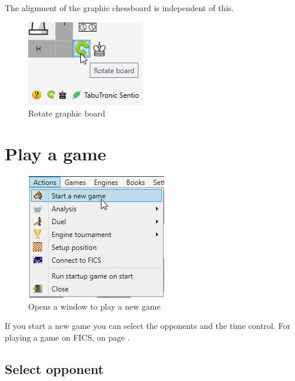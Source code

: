 \documentclass[11pt,a4paper]{article}
\begin{document}
The alignment of the graphic chessboard is independent of this.

\begin{figure}[H]
	\centering
	\includegraphics[scale=1.0]{rotate3.png}
	\caption{Rotate graphic board}
	\label{fig:Rotate3}
\end{figure}

\section{Play a game}

\begin{figure}[H]
	\centering
	\includegraphics[scale=1.0]{NewGame1.png}
	\caption{Opens a window to play a new game}
	\label{fig:NewGame1}
\end{figure}

If you start a new game you can select the opponents and the time control. For playing a game on FICS,  on page \pageref{FICS}.  	

\subsection{Select opponent} \label{SelectOpponent}
\end{document}
